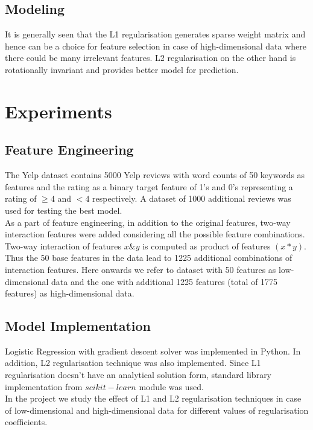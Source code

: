 \documentclass[paper=a4,fontsize=12pt]{article}
\begin{document}
\subsection{Modeling}
It is generally seen that the L1 regularisation generates sparse weight matrix and hence can be a choice for feature selection in case of high-dimensional data where there could be many irrelevant features. L2 regularisation on the other hand is rotationally invariant and provides better model for prediction.\\



\section{Experiments}
\subsection{Feature Engineering}
The Yelp dataset contains 5000 Yelp reviews with word counts of 50 keywords as features and the rating as a binary target feature of 1's and 0's representing a rating of $\geq 4$ and $< 4$ respectively. A dataset of 1000 additional reviews was used for testing the best model. \\

As a part of feature engineering, in addition to the original features, two-way interaction features were added considering all the possible feature combinations. Two-way interaction of features $x \& y$ is computed as product of features $(x*y)$. Thus the 50 base features in the data lead to 1225 additional combinations of interaction features. Here onwards we refer to dataset with 50 features as low-dimensional data and the one with additional 1225 features (total of 1775 features) as high-dimensional data.  

\subsection{Model Implementation}
Logistic Regression with gradient descent solver was implemented in Python. In addition, L2 regularisation technique was also implemented. Since L1 regularisation doesn't have an analytical solution form, standard library implementation from $scikit-learn$ module was used.\\

In the project we study the effect of L1 and L2 regularisation techniques in case of low-dimensional and high-dimensional data for different values of regularisation coefficients. \\
\end{document}
